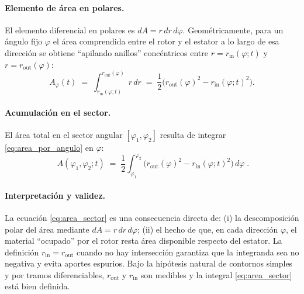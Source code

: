 \documentclass{LS}
\begin{document}
\paragraph{Elemento de área en polares.}
El elemento diferencial en polares es $dA = r\,dr\,d\varphi$.
Geométricamente, para un ángulo fijo $\varphi$ el área comprendida entre el rotor y el estator a lo largo de esa dirección
se obtiene ``apilando anillos'' concéntricos entre $r=r_{\mathrm{in}}(\varphi;t)$ y $r=r_{\mathrm{out}}(\varphi)$:
\[
A_\varphi(t) \;=\; \int_{r_{\mathrm{in}}(\varphi;t)}^{r_{\mathrm{out}}(\varphi)} r\,dr
\;=\; \frac{1}{2}\Big(r_{\mathrm{out}}(\varphi)^2 - r_{\mathrm{in}}(\varphi;t)^2\Big).
\tag{1}
\label{eq:area_por_angulo}
\]

\paragraph{Acumulación en el sector.}
El área total en el sector angular $[\varphi_1,\varphi_2]$ resulta de integrar \eqref{eq:area_por_angulo} en $\varphi$:
\[
\boxed{
\;A(\varphi_1,\varphi_2;t)\;=\;\frac{1}{2}\int_{\varphi_1}^{\varphi_2}
\Big(r_{\mathrm{out}}(\varphi)^2 - r_{\mathrm{in}}(\varphi;t)^2\Big)\,d\varphi\;.
}
\tag{2}
\label{eq:area_sector}
\]

\paragraph{Interpretación y validez.}
La ecuación \eqref{eq:area_sector} es una consecuencia directa de:
(i) la descomposición polar del área mediante $dA=r\,dr\,d\varphi$;
(ii) el hecho de que, en cada dirección $\varphi$, el material ``ocupado'' por el rotor resta área disponible respecto del estator.
La definición $r_{\mathrm{in}}=r_{\mathrm{out}}$ cuando no hay intersección garantiza que la integranda sea no negativa y evita aportes espurios.
Bajo la hipótesis natural de contornos simples y por tramos diferenciables, $r_{\mathrm{out}}$ y $r_{\mathrm{in}}$ son medibles y
la integral \eqref{eq:area_sector} está bien definida.
\end{document}
